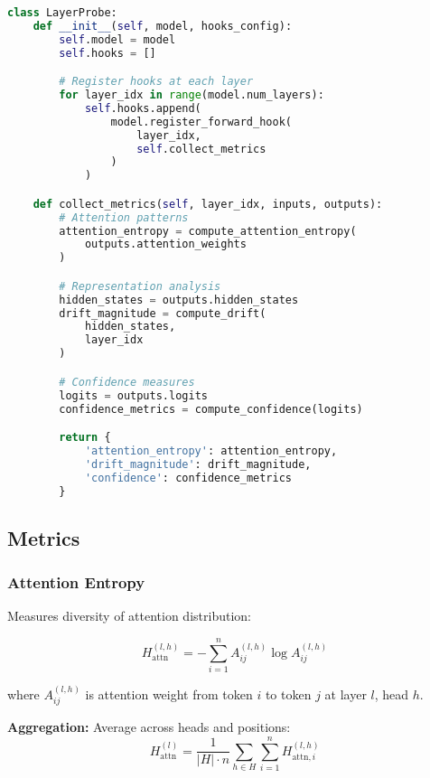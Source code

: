 \documentclass[11pt]{article}
\begin{document}
\begin{lstlisting}[language=Python, caption=LayerProbe Architecture]
class LayerProbe:
    def __init__(self, model, hooks_config):
        self.model = model
        self.hooks = []

        # Register hooks at each layer
        for layer_idx in range(model.num_layers):
            self.hooks.append(
                model.register_forward_hook(
                    layer_idx,
                    self.collect_metrics
                )
            )

    def collect_metrics(self, layer_idx, inputs, outputs):
        # Attention patterns
        attention_entropy = compute_attention_entropy(
            outputs.attention_weights
        )

        # Representation analysis
        hidden_states = outputs.hidden_states
        drift_magnitude = compute_drift(
            hidden_states,
            layer_idx
        )

        # Confidence measures
        logits = outputs.logits
        confidence_metrics = compute_confidence(logits)

        return {
            'attention_entropy': attention_entropy,
            'drift_magnitude': drift_magnitude,
            'confidence': confidence_metrics
        }
\end{lstlisting}

\subsection{Metrics}

\subsubsection{Attention Entropy}

Measures diversity of attention distribution:

\begin{equation}
H_{\text{attn}}^{(l,h)} = -\sum_{i=1}^{n} A_{ij}^{(l,h)} \log A_{ij}^{(l,h)}
\end{equation}

where $A_{ij}^{(l,h)}$ is attention weight from token $i$ to token $j$ at layer $l$, head $h$.

\textbf{Aggregation:} Average across heads and positions:
\begin{equation}
H_{\text{attn}}^{(l)} = \frac{1}{|H| \cdot n} \sum_{h \in H} \sum_{i=1}^{n} H_{\text{attn},i}^{(l,h)}
\end{equation}
\end{document}
